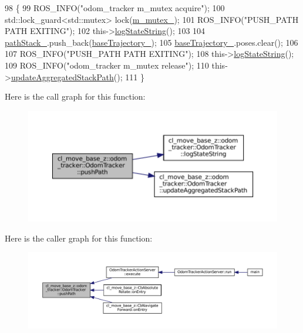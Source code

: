 \begin{DoxyCode}
98         \{
99             ROS\_INFO(\textcolor{stringliteral}{"odom\_tracker m\_mutex acquire"});
100             std::lock\_guard<std::mutex> lock(\hyperlink{classcl__move__base__z_1_1odom__tracker_1_1OdomTracker_aa371639e1eee269273dec8d3ab9dba0f}{m\_mutex\_});
101             ROS\_INFO(\textcolor{stringliteral}{"PUSH\_PATH PATH EXITING"});
102             this->\hyperlink{classcl__move__base__z_1_1odom__tracker_1_1OdomTracker_a6d0b450474d9d555205ff4281965164e}{logStateString}();
103 
104             \hyperlink{classcl__move__base__z_1_1odom__tracker_1_1OdomTracker_a1ccad1b568b6c65da43ba6639b6bd1ef}{pathStack\_}.push\_back(\hyperlink{classcl__move__base__z_1_1odom__tracker_1_1OdomTracker_a466d18a86df049f0f680e043bb5ea91f}{baseTrajectory\_});
105             \hyperlink{classcl__move__base__z_1_1odom__tracker_1_1OdomTracker_a466d18a86df049f0f680e043bb5ea91f}{baseTrajectory\_}.poses.clear();
106 
107             ROS\_INFO(\textcolor{stringliteral}{"PUSH\_PATH PATH EXITING"});
108             this->\hyperlink{classcl__move__base__z_1_1odom__tracker_1_1OdomTracker_a6d0b450474d9d555205ff4281965164e}{logStateString}();
109             ROS\_INFO(\textcolor{stringliteral}{"odom\_tracker m\_mutex release"});
110             this->\hyperlink{classcl__move__base__z_1_1odom__tracker_1_1OdomTracker_a7922f1e1e688a2ed62d32d9914985a9f}{updateAggregatedStackPath}();
111         \}
\end{DoxyCode}
Here is the call graph for this function\+:
\nopagebreak
\begin{figure}[H]
\begin{center}
\leavevmode
\includegraphics[width=350pt]{classcl__move__base__z_1_1odom__tracker_1_1OdomTracker_a205ee48ec8b4599658e7408fc4755239_cgraph}
\end{center}
\end{figure}
Here is the caller graph for this function\+:
\nopagebreak
\begin{figure}[H]
\begin{center}
\leavevmode
\includegraphics[width=350pt]{classcl__move__base__z_1_1odom__tracker_1_1OdomTracker_a205ee48ec8b4599658e7408fc4755239_icgraph}
\end{center}
\end{figure}
